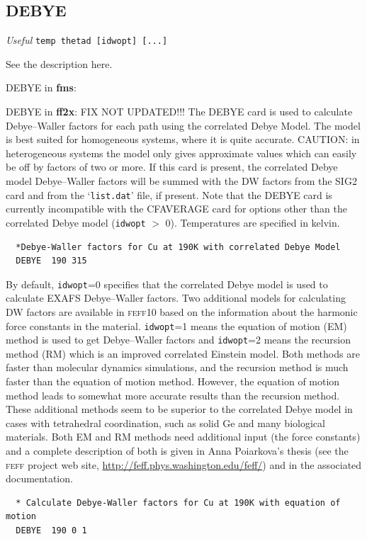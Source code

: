 \documentclass[11pt,oneside]{report} %
\newcommand{\feffcurrent}{\textsc{feff10}}
\renewcommand{\htmladdnormallink}[2]{\href{#2}{#1}}
\renewcommand{\htmlref}[2]{\hyperlink{#2}{#1}}
\newcommand{\program}[1]{\textsc{#1}}
\newcommand{\feff}{\program{feff}}
\newenvironment{Card}[4]%
      {\vspace{3ex}%
        \subsection{#1}
        \quad\textsl{#3}\newline
        \quad\texttt{#2}\newline%
        \label{card:#4}\\}
      {}
\newcommand{\file}[1]{`\texttt{#1}'}
\newcommand{\module}[1]{\textrm{\bf{#1}}}
\renewcommand{\htmlref}[2]{{#1}} %
\begin{document}
\begin{Card}{DEBYE}{temp thetad [idwopt] [...]}{Useful}{deb1}
\begin{latexonly}
  See the description \htmlref{here}{car:deb2}.
\end{latexonly}
 \begin{htmlonly}
  {\large DEBYE in \module{fms}:}\newline
 \end{htmlonly}  

 \begin{htmlonly}
  {\large DEBYE in \module{ff2x}:}\newline
 FIX  NOT UPDATED!!!
  The DEBYE card is used to calculate Debye--Waller factors for each
  path using the correlated Debye Model. The model is best suited for
  homogeneous systems, where it is quite accurate. CAUTION: in
  heterogeneous systems the model only gives approximate values which
  can easily be off by factors of two or more. If this card is present, 
  the correlated Debye model Debye--Waller factors will be summed with the 
  DW factors from the \htmlref{SIG2}{card:sig} card and from the \file{list.dat} 
  file, if present. Note that the DEBYE card is currently incompatible with the 
  \htmlref{CFAVERAGE}{card:cfa} card for options other than the correlated Debye 
  model (\texttt{idwopt} $>$ 0). Temperatures are specified in kelvin.

\begin{verbatim}
  *Debye-Waller factors for Cu at 190K with correlated Debye Model
  DEBYE  190 315
\end{verbatim}

  By default, \texttt{idwopt}=0 specifies that the correlated Debye model 
  is used to calculate EXAFS Debye--Waller factors. Two additional models for
  calculating DW factors are available in {\feffcurrent} based on the information
  about the harmonic force constants in the material. \texttt{idwopt}=1
  means the equation of motion (EM) method is used to get Debye--Waller
  factors and \texttt{idwopt}=2 means the recursion method (RM) which
  is an improved correlated Einstein model. Both methods are faster than 
  molecular dynamics simulations, and the recursion method is much faster 
  than the equation of motion method. However, the equation of motion method 
  leads to somewhat more accurate results than the recursion method. These 
  additional methods seem to be superior to the correlated Debye model in cases 
  with tetrahedral coordination, such as solid Ge and many biological materials. 
  Both EM and RM methods need additional input (the force constants) and a 
  complete description of both is given in Anna Poiarkova's thesis (see the 
  {\feff} project web site, \htmladdnormallink{http://feff.phys.washington.edu/feff/}{http://feff.phys.washington.edu/feff/Docs/Docs.html}) 
  and in the associated documentation.

\begin{verbatim}
  * Calculate Debye-Waller factors for Cu at 190K with equation of motion
  DEBYE  190 0 1
\end{verbatim}
 \end{htmlonly}

\end{Card}
\end{document}
